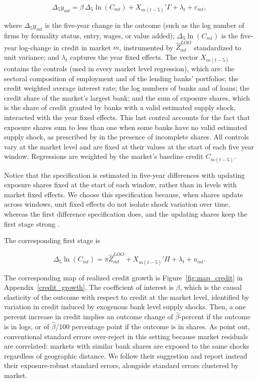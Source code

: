 \documentclass[12pt]{article}
\begin{document}
\begin{equation}
    \Delta_5 y_{mt} = \beta \, \Delta_5 \ln(C_{mt}) + X_{m(t-5)}'\Gamma + \lambda_t + \varepsilon_{mt},
    \label{eq:main_iv}
\end{equation}

where $\Delta_5 y_{mt}$ is the five-year change in the outcome (such as the log number of firms by formality status, entry, wages, or value added); $\Delta_5\ln(C_{mt})$ is the five-year log-change in credit in market $m$, instrumented by $\hat{Z}_{mt}^{LOO}$ standardized to unit variance; and $\lambda_t$ captures the year fixed effects. The vector $X_{m(t-5)}$ contains the controls (used in every market level regression), which are: the sectoral composition of employment and of the lending banks' portfolios; the credit weighted average interest rate; the log numbers of banks and of loans; the credit share of the market's largest bank; and the sum of exposure shares, which is the share of credit granted by banks with a valid estimated supply shock, interacted with the year fixed effects. This last control accounts for the fact that exposure shares sum to less than one when some banks have no valid estimated supply shock, as prescribed by \citet{borusyak2022quasi} in the presence of incomplete shares. All controls vary at the market level and are fixed at their values at the start of each five year window. Regressions are weighted by the market's baseline credit $C_{m(t-5)}$.

Notice that the specification is estimated in five-year differences with updating exposure shares fixed at the start of each window, rather than in levels with market fixed effects. We choose this specification because, when shares update across windows, unit fixed effects do not isolate shock variation over time, whereas the first difference specification does, and the updating shares keep the first stage strong \citep{borusyak2022quasi}.

The corresponding first stage is

\begin{equation}
    \Delta_5 \ln(C_{mt}) = \pi \hat{Z}_{mt}^{LOO} + X_{m(t-5)}'\Pi + \lambda_t + u_{mt}.
    \label{eq:first_stage}
\end{equation}

The corresponding map of realized credit growth is Figure~\ref{fig:map_credit} in  Appendix~\ref{credit_growth}. The coefficient of interest is $\beta$, which is the causal elasticity of the outcome with respect to credit at the market level, identified by variation in credit induced by exogenous bank level supply shocks. Then, a one percent increase in credit implies an outcome change of $\hat{\beta}$-percent if the outcome is in logs, or of $\hat{\beta}$/100 percentage point if the outcome is in shares. As \citet{adao2019shiftshare} point out, conventional standard errors over-reject in this setting because market residuals are correlated: markets with similar bank shares are exposed to the same shocks regardless of geographic distance. We follow their suggestion and report instead their exposure-robust standard errors, alongside standard errors clustered by market. 
\end{document}

